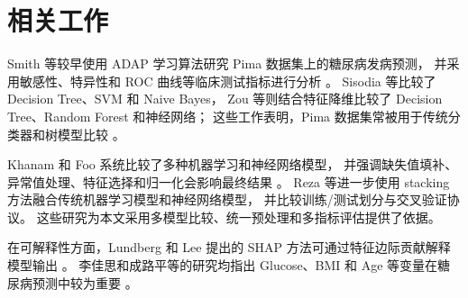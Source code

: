 \section{相关工作}

Smith 等较早使用 ADAP 学习算法研究 Pima 数据集上的糖尿病发病预测，
并采用敏感性、特异性和 ROC 曲线等临床测试指标进行分析
\cite{smithUsingADAPLearning1988a}。
Sisodia 等比较了 Decision Tree、SVM 和 Naive Bayes，
Zou 等则结合特征降维比较了 Decision Tree、Random Forest 和神经网络；
这些工作表明，Pima 数据集常被用于传统分类器和树模型比较
\cite{sisodiaPredictionDiabetesUsing2018a,zouPredictingDiabetesMellitus2018}。

Khanam 和 Foo 系统比较了多种机器学习和神经网络模型，
并强调缺失值填补、异常值处理、特征选择和归一化会影响最终结果
\cite{khanamComparisonMachineLearning2021}。
Reza 等进一步使用 stacking 方法融合传统机器学习模型和神经网络模型，
并比较训练/测试划分与交叉验证协议\cite{rezaImprovingDiabetesDisease2024}。
这些研究为本文采用多模型比较、统一预处理和多指标评估提供了依据。

在可解释性方面，Lundberg 和 Lee 提出的 SHAP 方法可通过特征边际贡献解释模型输出
\cite{lundbergUnifiedApproachInterpreting2017}。
李佳思和成路平等的研究均指出 Glucose、BMI 和 Age 等变量在糖尿病预测中较为重要
\cite{LiJiaSiJiYuJiQiXueXiDeTangNiaoBingYuCeJiSHAPTeZhengFenXi2023,
ChengLuPingJiYuJiQiXueXiDe2XingTangNiaoBingFaBingYinSuFenXiYuYuCe2025}。
